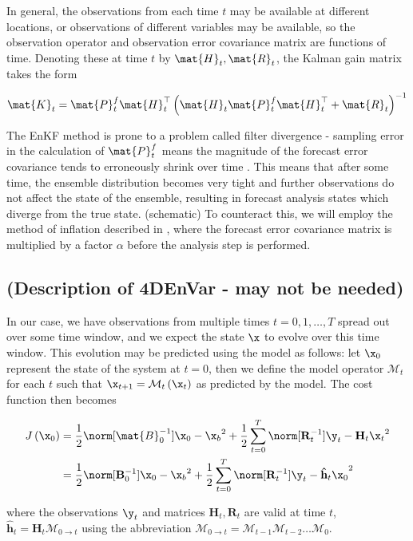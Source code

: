 In general, the observations from each time $t$ may be available at different locations, or observations of different variables may be available, so the observation operator and observation error covariance matrix are functions of time. Denoting these at time $t$ by $\mat{H}_t, \mat{R}_t$, the Kalman gain matrix takes the form

\[
\mat{K}_t = \mat{P}^f_t\mat{H}_t^\top\left(\mat{H}_t\mat{P}^f_t\mat{H}_t^\top + \mat{R}_t\right)^{-1}
\]

The EnKF method is prone to a problem called filter divergence -  sampling error in the calculation of $\mat{P}^f_t$ means the magnitude of the forecast error covariance tends to erroneously shrink over time \parencite{Jazwinski1970}. This means that after some time, the ensemble distribution becomes very tight and further observations do not affect the state of the ensemble, resulting in forecast analysis states which diverge from the true state. (schematic) To counteract this, we will employ the method of inflation described in \cite{Anderson1999}, where the forecast error covariance matrix is multiplied by a factor $\alpha$ before the analysis step is performed.

\subsection{(Description of 4DEnVar - may not be needed)}

In our case, we have observations from multiple times $t = 0,1,\dots,T$ spread out over some time window, and we expect the state $\x$ to evolve over this time window. This evolution may be predicted using the model as follows: let $\x_0$ represent the state of the system at $t=0$, then we define the model operator $\mathcal{M}_t$ for each $t$ such that $\x_{t+1} = \mathcal{M}_t\left(\x_t\right)$ as predicted by the model. The cost function then becomes

\begin{align}
	J\left(\x_0\right) &= \frac 1 2 \norm[\mat{B}_0^{-1}]{\x_0 - \x_b}^2 + \frac 1 2 \sum_{t=0}^T \norm[\mathbf{R}_t^{-1}]{\y_t - \mathbf{H}_t\x_t}^2 \\
	&= \frac 1 2 \norm[\mathbf{B}_0^{-1}]{\x_0 - \x_b}^2 + \frac 1 2 \sum_{t=0}^T \norm[\mathbf{R}_t^{-1}]{\y_t - \mathbf{\hat{h}}_t\x_0}^2
\end{align}

where the observations $\y_t$ and matrices $\mathbf{H}_t,\mathbf{R}_t$ are valid at time $t$,  $\mathbf{\hat{h}}_t = \mathbf{H}_t\mathcal{M}_{0 \rightarrow t}$ using the abbreviation $ \mathcal{M}_{0 \rightarrow t} = \mathcal{M}_{t-1}\mathcal{M}_{t-2}\dots\mathcal{M}_0$.

